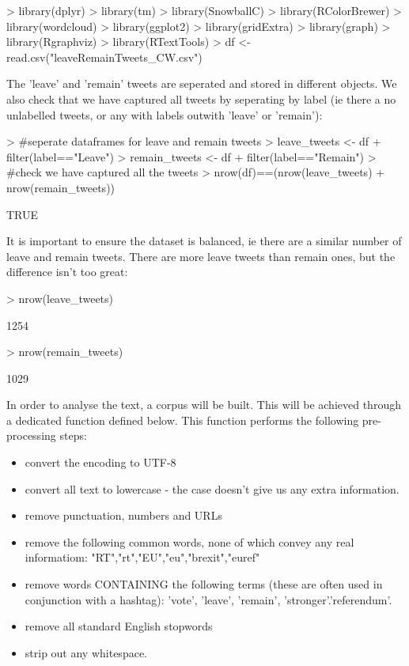 \documentclass[10pt]{article}
\begin{document}
\begin{Schunk}
\begin{Sinput}
> library(dplyr)
> library(tm)
> library(SnowballC)
> library(RColorBrewer)
> library(wordcloud)
> library(ggplot2)
> library(gridExtra)
> library(graph)
> library(Rgraphviz)
> library(RTextTools)
> df <- read.csv("leaveRemainTweets_CW.csv")
\end{Sinput}
\end{Schunk}
The 'leave' and 'remain' tweets are seperated and stored in different objects. We also check that we have captured all tweets by seperating by label (ie there a no unlabelled tweets, or any with labels outwith 'leave' or 'remain'):
\begin{Schunk}
\begin{Sinput}
> #seperate dataframes for leave and remain tweets
> leave_tweets <- df%
+   filter(label=="Leave")
> remain_tweets <- df%
+   filter(label=="Remain")
> #check we have captured all the tweets
> nrow(df)==(nrow(leave_tweets) + nrow(remain_tweets))
\end{Sinput}
\begin{Soutput}
[1] TRUE
\end{Soutput}
\end{Schunk}
It is important to ensure the dataset is balanced, ie there are a similar number of leave and remain tweets. There are more leave tweets than remain ones, but the difference isn't too great:
\begin{Schunk}
\begin{Sinput}
> nrow(leave_tweets)
\end{Sinput}
\begin{Soutput}
[1] 1254
\end{Soutput}
\begin{Sinput}
> nrow(remain_tweets)
\end{Sinput}
\begin{Soutput}
[1] 1029
\end{Soutput}
\end{Schunk}

In order to analyse the text, a corpus will be built. This will be achieved through a dedicated function defined below. This function performs the following pre-processing steps:

\begin{itemize}
  \item convert the encoding to UTF-8
  \item convert all text to lowercase - the case doesn't give us any extra information.
  \item remove punctuation, numbers and URLs
  \item remove the following common words, none of which convey any real informatiom: "RT","rt","EU","eu","brexit","euref"
  \item remove words CONTAINING the following terms (these are often used in conjunction with a hashtag): 'vote', 'leave', 'remain', 'stronger'.'referendum'.
  \item remove all standard English stopwords
  \item strip out any whitespace.
\end{itemize}
\end{document}
